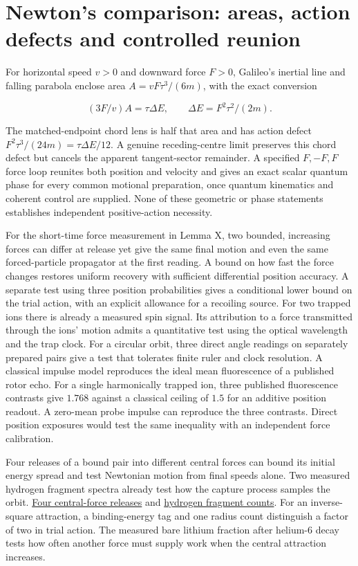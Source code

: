 \documentclass[11pt,a4paper]{article}
\begin{document}
\section{Newton's comparison: areas, action defects and controlled
reunion}\label{newtons-comparison-areas-action-defects-and-controlled-reunion}

For horizontal speed \(v>0\) and downward force \(F>0\), Galileo's
inertial line and falling parabola enclose area \(A=vF\tau^3/(6m)\),
with the exact conversion

\[\boxed{(3F/v)A=\tau\Delta E,\qquad\Delta E=F^2\tau^2/(2m).}\]

The matched-endpoint chord lens is half that area and has action defect
\(F^2\tau^3/(24m)=\tau\Delta E/12\). A genuine receding-centre limit
preserves this chord defect but cancels the apparent tangent-sector
remainder. A specified \(F,-F,F\) force loop reunites both position and
velocity and gives an exact scalar quantum phase for every common
motional preparation, once quantum kinematics and coherent control are
supplied. None of these geometric or phase statements establishes
independent positive-action necessity.

For the short-time force measurement in Lemma X, two bounded, increasing
forces can differ at release yet give the same final motion and even the
same forced-particle propagator at the first reading. A bound on how
fast the force changes restores uniform recovery with sufficient
differential position accuracy. A separate test using three position
probabilities gives a conditional lower bound on the trial action, with
an explicit allowance for a recoiling source. For two trapped ions there
is already a measured spin signal. Its attribution to a force
transmitted through the ions' motion admits a quantitative test using
the optical wavelength and the trap clock. For a circular orbit, three
direct angle readings on separately prepared pairs give a test that
tolerates finite ruler and clock resolution. A classical impulse model
reproduces the ideal mean fluorescence of a published rotor echo. For a
single harmonically trapped ion, three published fluorescence contrasts
give \(1.768\) against a classical ceiling of \(1.5\) for an additive
position readout. A zero-mean probe impulse can reproduce the three
contrasts. Direct position exposures would test the same inequality with
an independent force calibration.

Four releases of a bound pair into different central forces can bound
its initial energy spread and test Newtonian motion from final speeds
alone. Two measured hydrogen fragment spectra already test how the
capture process samples the orbit.
\hyperref[four-central-force-releases-measured-by-final-speeds]{Four
central-force releases} and
\hyperref[what-two-hydrogen-fragment-spectra-already-test]{hydrogen
fragment counts}. For an inverse-square attraction, a binding-energy tag
and one radius count distinguish a factor of two in trial action. The
measured bare lithium fraction after helium-6 decay tests how often
another force must supply work when the central attraction increases.
\end{document}
